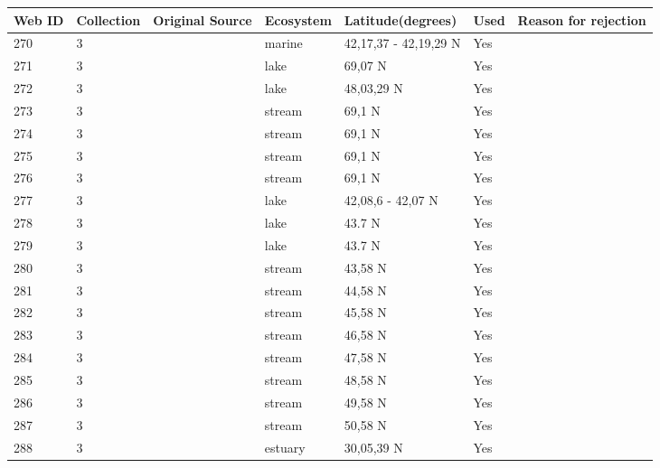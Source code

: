 \documentclass[12pt]{article}
\begin{document}
\begin{landscape}
    \begin{table}[h!]
    \centering
    {\footnotesize
      \begin{tabular}{p{2.8cm}p{1.3cm}p{5.5cm}p{2.2cm}p{2.5cm}lp{3.5cm}}
        \hline
        Web ID & Collection & Original Source & Ecosystem & Latitude(degrees) & Used  & Reason for rejection  \\
        \hline
        270   & 3 & \citet{Filgueira2011}  & marine & 42,17,37 - 42,19,29 N & Yes   &       \\
        271   & 3 & \citet{Amundsen2013}  & lake  & 69,07 N & Yes   &        \\
        272   & 3 & \citet{Hampton2011}    & lake  & 48,03,29 N & Yes   &       \\
        273   & 3 & \citet{Parker2006}  & stream & 69,1 N & Yes   &       \\
        274   & 3 & \citet{Parker2006}  & stream & 69,1 N & Yes   &       \\
        275   & 3 & \citet{Parker2006}  & stream & 69,1 N & Yes   &       \\
        276   & 3 & \citet{Parker2006}  & stream & 69,1 N & Yes   &       \\
        277   & 3 & \citet{Massana1996}  & lake  & 42,08,6 - 42,07 N & Yes   &       \\
        278   & 3 & \citet{Stewart2011}    & lake  & 43.7 N & Yes   &       \\
        279   & 3 & \citet{Stewart2011}    & lake  & 43.7 N & Yes   &       \\
        280   & 3 & \citet{Cromar1996}  & stream & 43,58 N & Yes   &       \\
        281   & 3 & \citet{Cromar1996}  & stream & 44,58 N & Yes   &       \\
        282   & 3 & \citet{Cromar1996}  & stream & 45,58 N & Yes   &       \\
        283   & 3 & \citet{Cromar1996}  & stream & 46,58 N & Yes   &       \\
        284   & 3 & \citet{Cromar1996}  & stream & 47,58 N & Yes   &       \\
        285   & 3 & \citet{Cromar1996}  & stream & 48,58 N & Yes   &       \\
        286   & 3 & \citet{Cromar1996}  & stream & 49,58 N & Yes   &       \\
        287   & 3 & \citet{Cromar1996}  & stream & 50,58 N & Yes   &       \\
        288   & 3 & \citet{Christian1999}    & estuary & 30,05,39 N & Yes   &       \\

\end{tabular}}
\end{table}
\end{landscape}
\end{document}
